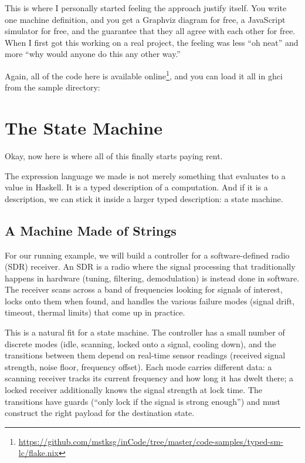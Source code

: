 \documentclass[]{article}
\newenvironment{Shaded}{}{}
\newcommand{\ExtensionTok}[1]{#1}
\newcommand{\NormalTok}[1]{#1}
\newcommand{\OperatorTok}[1]{\textcolor[rgb]{0.40,0.40,0.40}{#1}}
\renewcommand{\href}[2]{#2\footnote{\url{#1}}}
\begin{document}
This is where I personally started feeling the approach justify itself. You
write one machine definition, and you get a Graphviz diagram for free, a
JavaScript simulator for free, and the guarantee that they all agree with each
other for free. When I first got this working on a real project, the feeling was
less ``oh neat'' and more ``why would anyone do this any other way.''

Again, all of the code here is
\href{https://github.com/mstksg/inCode/tree/master/code-samples/typed-sm-lc/flake.nix}{available
online}, and you can load it all in ghci from the sample directory:

\begin{Shaded}
\end{Shaded}

\section{The State Machine}\label{the-state-machine}

Okay, now here is where all of this finally starts paying rent.

The expression language we made is not merely something that evaluates to a
value in Haskell. It is a typed description of a computation. And if it is a
description, we can stick it inside a larger typed description: a state machine.

\subsection{A Machine Made of Strings}\label{a-machine-made-of-strings}

For our running example, we will build a controller for a software-defined radio
(SDR) receiver. An SDR is a radio where the signal processing that traditionally
happens in hardware (tuning, filtering, demodulation) is instead done in
software. The receiver scans across a band of frequencies looking for signals of
interest, locks onto them when found, and handles the various failure modes
(signal drift, timeout, thermal limits) that come up in practice.

This is a natural fit for a state machine. The controller has a small number of
discrete modes (idle, scanning, locked onto a signal, cooling down), and the
transitions between them depend on real-time sensor readings (received signal
strength, noise floor, frequency offset). Each mode carries different data: a
scanning receiver tracks its current frequency and how long it has dwelt there;
a locked receiver additionally knows the signal strength at lock time. The
transitions have guards (``only lock if the signal is strong enough'') and must
construct the right payload for the destination state.
\end{document}
